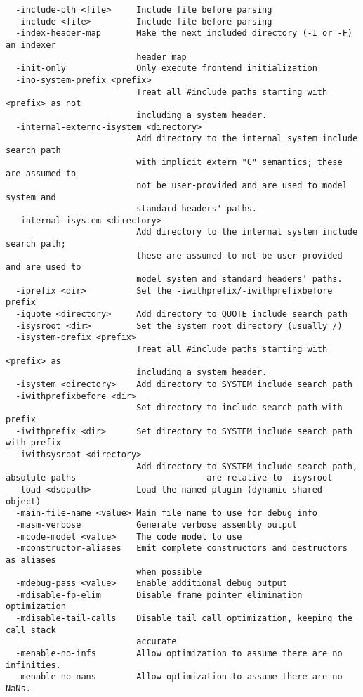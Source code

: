 \begin{verbatim}
  -include-pth <file>     Include file before parsing
  -include <file>         Include file before parsing
  -index-header-map       Make the next included directory (-I or -F) an indexer 
                          header map
  -init-only              Only execute frontend initialization
  -ino-system-prefix <prefix>
                          Treat all #include paths starting with <prefix> as not 
                          including a system header.
  -internal-externc-isystem <directory>
                          Add directory to the internal system include search path 
                          with implicit extern "C" semantics; these are assumed to 
                          not be user-provided and are used to model system and 
                          standard headers' paths.
  -internal-isystem <directory>
                          Add directory to the internal system include search path; 
                          these are assumed to not be user-provided and are used to 
                          model system and standard headers' paths.
  -iprefix <dir>          Set the -iwithprefix/-iwithprefixbefore prefix
  -iquote <directory>     Add directory to QUOTE include search path
  -isysroot <dir>         Set the system root directory (usually /)
  -isystem-prefix <prefix>
                          Treat all #include paths starting with <prefix> as 
                          including a system header.
  -isystem <directory>    Add directory to SYSTEM include search path
  -iwithprefixbefore <dir>
                          Set directory to include search path with prefix
  -iwithprefix <dir>      Set directory to SYSTEM include search path with prefix
  -iwithsysroot <directory>
                          Add directory to SYSTEM include search path, absolute paths                          are relative to -isysroot
  -load <dsopath>         Load the named plugin (dynamic shared object)
  -main-file-name <value> Main file name to use for debug info
  -masm-verbose           Generate verbose assembly output
  -mcode-model <value>    The code model to use
  -mconstructor-aliases   Emit complete constructors and destructors as aliases 
                          when possible
  -mdebug-pass <value>    Enable additional debug output
  -mdisable-fp-elim       Disable frame pointer elimination optimization
  -mdisable-tail-calls    Disable tail call optimization, keeping the call stack 
                          accurate
  -menable-no-infs        Allow optimization to assume there are no infinities.
  -menable-no-nans        Allow optimization to assume there are no NaNs.

\end{verbatim}
